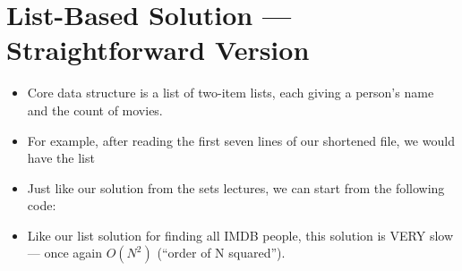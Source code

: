 \documentclass[letterpaper,10pt,english]{sphinxmanual}
\begin{document}
\section{List-Based Solution — Straightforward Version}
\label{\detokenize{lecture_notes/lec16_dictionaries1:list-based-solution-straightforward-version}}\begin{itemize}
\item {} 
Core data structure is a list of two-item lists, each giving a
person’s name and the count of movies.

\item {} 
For example, after reading the first seven lines of our shortened
 file, we would have the list

%
\begin{sphinxVerbatim}[commandchars=\\\{\}]
\PYG{p}{[} \PYG{p}{[} \PYG{p}{]} \PYG{p}{[} \PYG{p}{]}
  \PYG{p}{[} \PYG{p}{]} \PYG{p}{[} \PYG{p}{]} \PYG{p}{]}
\end{sphinxVerbatim}

\item {} 
Just like our solution from the sets lectures, we can start from the
following code:

%
\begin{sphinxVerbatim}[commandchars=\\\{\}]
  
  \PYG{p}{[}\PYG{p}{]}
      
      
      \PYG{p}{[}\PYG{p}{]}
\end{sphinxVerbatim}

\item {} 
Like our list solution for finding all IMDB people, this solution is
VERY slow — once again \(O(N^2)\) (“order of N squared”).

\end{itemize}
\end{document}

